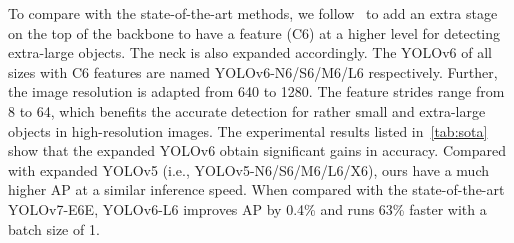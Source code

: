 \documentclass[10pt,twocolumn,letterpaper]{article}
\begin{document}
  To compare with the state-of-the-art methods, we follow~\cite{yolov5} to add an extra stage on the top of the backbone to have a feature (C6) at a higher level for detecting extra-large objects. The neck is also expanded accordingly. The  YOLOv6 of all sizes with C6 features are named YOLOv6-N6/S6/M6/L6 respectively. 
  Further, the image resolution is adapted from 640 to 1280. The feature strides range from 8 to 64, which benefits the accurate detection for rather small and extra-large objects in high-resolution images. The experimental results listed in~\cref{tab:sota} show that the expanded YOLOv6 obtain significant gains in accuracy. Compared with expanded YOLOv5 (i.e., YOLOv5-N6/S6/M6/L6/X6), ours have a much higher AP at a similar inference speed. When compared with the state-of-the-art YOLOv7-E6E, YOLOv6-L6 improves AP by 0.4\% and runs 63\% faster with a batch size of 1.

  \begin{table}[ht]
    \centering
  \caption{Ablation study for all designs on YOLOv6-S.}
  \label{tab:ablate:total}
  \end{table}
\end{document}
